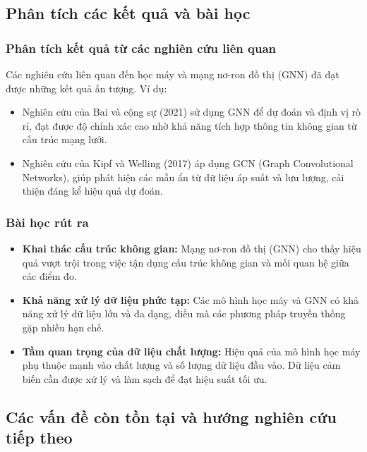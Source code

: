 \subsection{Phân tích các kết quả và bài học}
\subsubsection{Phân tích kết quả từ các nghiên cứu liên quan}
Các nghiên cứu liên quan đến học máy và mạng nơ-ron đồ thị (GNN) đã đạt được những kết quả ấn tượng. Ví dụ:
\begin{itemize}
    \item Nghiên cứu của Bai và cộng sự (2021) sử dụng GNN để dự đoán và định vị rò rỉ, đạt được độ chính xác cao nhờ khả năng tích hợp thông tin không gian từ cấu trúc mạng lưới.
    \item Nghiên cứu của Kipf và Welling (2017) áp dụng GCN (Graph Convolutional Networks), giúp phát hiện các mẫu ẩn từ dữ liệu áp suất và lưu lượng, cải thiện đáng kể hiệu quả dự đoán.
\end{itemize}

\subsubsection{Bài học rút ra}
\begin{itemize}
    \item \textbf{Khai thác cấu trúc không gian:} Mạng nơ-ron đồ thị (GNN) cho thấy hiệu quả vượt trội trong việc tận dụng cấu trúc không gian và mối quan hệ giữa các điểm đo.
    \item \textbf{Khả năng xử lý dữ liệu phức tạp:} Các mô hình học máy và GNN có khả năng xử lý dữ liệu lớn và đa dạng, điều mà các phương pháp truyền thống gặp nhiều hạn chế.
    \item \textbf{Tầm quan trọng của dữ liệu chất lượng:} Hiệu quả của mô hình học máy phụ thuộc mạnh vào chất lượng và số lượng dữ liệu đầu vào. Dữ liệu cảm biến cần được xử lý và làm sạch để đạt hiệu suất tối ưu.
\end{itemize}

\subsection{Các vấn đề còn tồn tại và hướng nghiên cứu tiếp theo}
